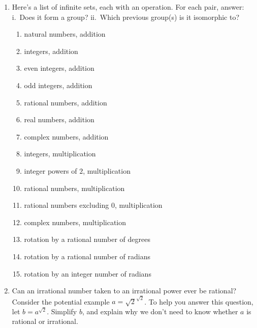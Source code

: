 \documentclass[../gatm.tex]{subfiles}
\begin{document}
\begin{enumerate}
\setcounter{enumi}{\value{inf_problem_i}}
\item Here’s a list of infinite sets, each with an operation. For each pair, answer: i.~Does it form a group? ii.~Which previous group(s) is it isomorphic to?
\begin{enumerate}
\item natural numbers, addition
\item integers, addition
\item even integers, addition
\item odd integers, addition
\item rational numbers, addition
\item real numbers, addition
\item complex numbers, addition
\item integers, multiplication
\item integer powers of $2$, multiplication
\item rational numbers, multiplication
\item rational numbers excluding $0$, multiplication
\item complex numbers, multiplication
\item rotation by a rational number of degrees
\item rotation by a rational number of radians
\item rotation by an integer number of radians
\end{enumerate}
\item Can an irrational number taken to an irrational power ever be rational? Consider the potential example $a = \sqrt{2}^{\sqrt{2}}$. To help you answer this question, let $b = a^{\sqrt{2}}$. Simplify $b$, and explain why we don’t need to know whether $a$ is rational or irrational.
\end{enumerate}
\end{document}
